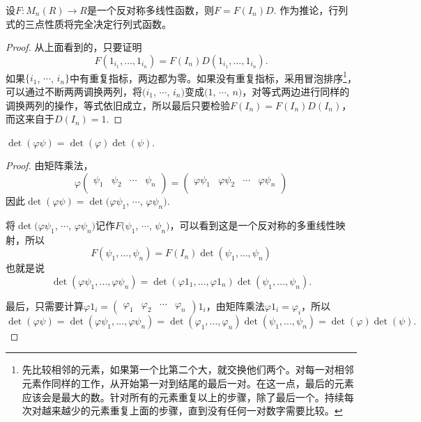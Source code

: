 \begin{pro}
设$F:M_n(R)\to R$是一个反对称多线性函数，则$F=F(I_n)D$. 作为推论，行列式的三点性质将完全决定行列式函数。
\end{pro}

\begin{proof} 
	从上面看到的，只要证明
	\[
		F(1_{i_1},\dots,1_{i_n})=F(I_n)D(1_{i_1},\dots,1_{i_n}).
	\]
	如果$\{i_1$, $\cdots$, $i_n\}$中有重复指标，两边都为零。如果没有重复指标，采用冒泡排序\footnote{先比较相邻的元素，如果第一个比第二个大，就交换他们两个。对每一对相邻元素作同样的工作，从开始第一对到结尾的最后一对。在这一点，最后的元素应该会是最大的数。针对所有的元素重复以上的步骤，除了最后一个。持续每次对越来越少的元素重复上面的步骤，直到没有任何一对数字需要比较。}，可以通过不断两两调换两列，将$(i_1$, $\cdots$, $i_n)$变成$(1$, $\cdots$, $n)$，对等式两边进行同样的调换两列的操作，等式依旧成立，所以最后只要检验$F(I_n)=F(I_n)D(I_n)$，而这来自于$D(I_n)=1$.
\end{proof}

\begin{pro}[行列式乘法公式]
$\det(\varphi \psi)=\det(\varphi)\det(\psi)$.
\end{pro}

\begin{proof} 
	由矩阵乘法，
	\[
	\varphi
	\begin{pmatrix}
	\psi_{1} & \psi_{2} & \cdots & \psi_{n}\\
	\end{pmatrix}
	=
	\begin{pmatrix}
	\varphi\psi_{1} & \varphi\psi_{2} & \cdots & \varphi\psi_{n}\\
	\end{pmatrix}
	\]
	因此$\det (\varphi \psi)=\det (\varphi\psi_{1}$, $\cdots$, $\varphi\psi_{n})$.

	将$\det(\varphi\psi_{1}$, $\cdots$, $\varphi\psi_{n})$记作$F(\psi_{1}$, $\cdots$, $\psi_{n})$，可以看到这是一个反对称的多重线性映射，所以
	\[
	F(\psi_{1},\dots,\psi_{n})=F(I_n)\det (\psi_{1},\dots,\psi_{n})
	\]
	也就是说
	\[
	\det (\varphi\psi_{1},\dots,\varphi\psi_{n})=\det(\varphi 1_1,\dots,\varphi 1_n)\det(\psi_{1},\dots,\psi_{n}).
	\]

	最后，只需要计算$\varphi 1_i=\begin{pmatrix}\varphi_{1} & \varphi_{2} & \cdots & \varphi_{n}\end{pmatrix}1_i$，由矩阵乘法$\varphi 1_i=\varphi_i$，所以
	\[
	\det(\varphi\psi)=\det(\varphi\psi_{1},\dots,\varphi\psi_{n})=\det(\varphi_1,\dots,\varphi_n)\det(\psi_{1},\dots,\psi_{n})=\det(\varphi)\det(\psi).
	\]
\end{proof}


